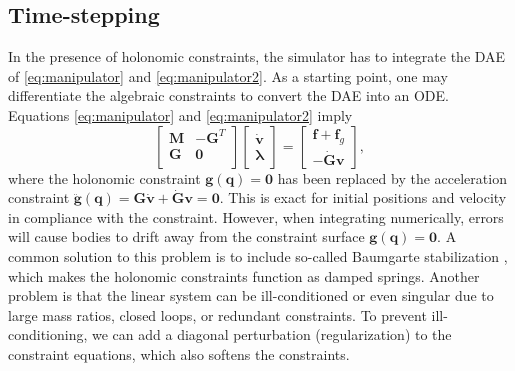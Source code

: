 \documentclass[preprint,12pt]{elsarticle}
\let\vec\bm
\let\mat\mathbf
\numberwithin{equation}{section}
\def\conf{q}
\begin{document}
\subsection{Time-stepping}
In the presence of holonomic constraints, the simulator has to integrate the DAE of \eqref{eq:manipulator} and \eqref{eq:manipulator2}.
As a starting point, one may differentiate the algebraic constraints to convert the DAE into an ODE.
Equations \eqref{eq:manipulator} and \eqref{eq:manipulator2} imply
\begin{equation}
    \label{eq:dae_to_ode}
    \begin{bmatrix}
        \mat{M} & -\mat{G}^T \\
        \mat{G} & \vec{0}    \\
    \end{bmatrix}
    \begin{bmatrix}
        \dot{\vec{v}} \\ \vec{\lambda}
    \end{bmatrix}
    =
    \begin{bmatrix}
        \vec{f} + \vec{f}_g \\
        -\dot{\mat{G}}\vec{v}
    \end{bmatrix},
\end{equation}
where the holonomic constraint $\vec{g}(\vec{\conf}) = \vec{0}$ has been replaced by the acceleration constraint $\ddot{\vec{g}}(\vec{\conf}) = \mat{G}\dot{\vec{v}} + \dot{\mat{G}}\vec{v} = \vec{0}$.
This is exact for initial positions and velocity in compliance with the constraint.
However, when integrating numerically, errors will cause bodies to drift away from the constraint surface $\vec{g}(\vec{q}) = \vec{0}$.
A common solution to this problem is to include so-called Baumgarte stabilization \cite{baumgarte1972stabilization}, which makes the holonomic constraints function as damped springs.
Another problem is that the linear system can be ill-conditioned or even singular due to large mass ratios, closed loops, or redundant constraints.
To prevent ill-conditioning, we can add a diagonal perturbation (regularization) to the constraint equations, which also softens the constraints.
\end{document}
